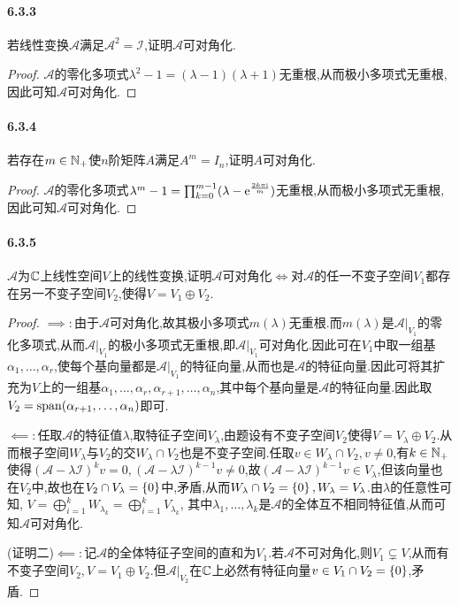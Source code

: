 \documentclass[11pt]{article}
\begin{document}
\paragraph{6.3.3}若线性变换$\mathscr{A}$满足$\mathscr{A}^2=\mathscr{I}$,证明$\mathscr{A}$可对角化.
\begin{proof}
    $\mathscr{A}$的零化多项式$\lambda^2-1=(\lambda-1)(\lambda+1)$无重根,从而极小多项式无重根,因此可知$\mathscr{A}$可对角化.
\end{proof}
\paragraph{6.3.4}若存在$m\in \mathbb{N}_+$使$n$阶矩阵$A$满足$A^m=I_n$,证明$A$可对角化.
\begin{proof}
    $\mathscr{A}$的零化多项式$\lambda^m-1=\prod_{k=0}^{m-1}(\lambda-\mathrm{e}^{\frac{2k\pi\mathrm{i}}{m}})$无重根,从而极小多项式无重根,因此可知$\mathscr{A}$可对角化.
\end{proof}
\paragraph{6.3.5}$\mathscr{A}$为$\mathbb{C}$上线性空间$V$上的线性变换,证明$\mathscr{A}$可对角化$\iff$对$\mathscr{A}$的任一不变子空间$V_1$都存在另一不变子空间$V_2$,使得$V=V_1\oplus V_2$.
\begin{proof}
    $\implies:$由于$\mathscr{A}$可对角化,故其极小多项式$m(\lambda)$无重根.而$m(\lambda)$是$\mathscr{A}|_{V_1}$的零化多项式,从而$\mathscr{A}|_{V_1}$的极小多项式无重根,即$\mathscr{A}|_{V_1}$可对角化.因此可在$V_1$中取一组基$\alpha_1,\dots,\alpha_r$,使每个基向量都是$\mathscr{A}|_{V_1}$的特征向量,从而也是$\mathscr{A}$的特征向量.因此可将其扩充为$V$上的一组基$\alpha_1,\dots,\alpha_r,\alpha_{r+1},\dots,\alpha_n$,其中每个基向量是$\mathscr{A}$的特征向量.因此取$V_2=\mathrm{span}(\alpha_{r+1},\dots,\alpha_n)$即可.

    $\impliedby:$任取$\mathscr{A}$的特征值$\lambda$,取特征子空间$V_{\lambda}$,由题设有不变子空间$V_2$使得$V=V_{\lambda}\oplus V_2$.从而根子空间$W_{\lambda}$与$V_2$的交$W_{\lambda}\cap V_2$也是不变子空间.任取$v\in W_{\lambda}\cap V_2, v\neq 0$,有$k\in \mathbb{N}_+$使得$(\mathscr{A}-\lambda\mathscr{I})^k v=0, (\mathscr{A}-\lambda\mathscr{I})^{k-1} v\neq 0$,故$(\mathscr{A}-\lambda\mathscr{I})^{k-1} v\in V_{\lambda}$,但该向量也在$V_2$中,故也在$V_2\cap V_{\lambda}=\left\{0\right\}$中,矛盾,从而$W_{\lambda}\cap V_2=\left\{0\right\}, W_\lambda=V_{\lambda}$.由$\lambda$的任意性可知, $V=\bigoplus_{i=1}^k W_{\lambda_k}=\bigoplus_{i=1}^k V_{\lambda_k}$, 其中$\lambda_1,\dots,\lambda_k$是$\mathscr{A}$的全体互不相同特征值,从而可知$\mathscr{A}$可对角化.

    (证明二)$\impliedby:$记$\mathscr{A}$的全体特征子空间的直和为$V_1$.若$\mathscr{A}$不可对角化,则$V_1\subsetneq V$,从而有不变子空间$V_2, V=V_1\oplus V_2$.但$\mathscr{A}|_{V_2}$在$\mathbb{C}$上必然有特征向量$v\in V_1\cap V_2=\left\{0\right\}$,矛盾.
\end{proof}
\end{document}
